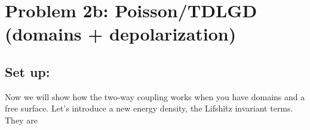 \documentclass[paper=a4, fontsize=14pt]{scrartcl} %
\numberwithin{equation}{section} %
\numberwithin{figure}{section} %
\numberwithin{table}{section} %
\begin{document}
\newpage

\vspace*{-65pt}

\section*{Problem 2b: Poisson/TDLGD \hspace*{-4pt}(domains\hspace*{-4pt} + \hspace*{-4pt}depolarization)}

\vspace*{-10pt}

\subsection*{Set up:}

Now we will show how the two-way coupling works when you have domains and a free surface. Let's introduce a new energy density, the Lifshitz invariant terms. They are
\end{document}
